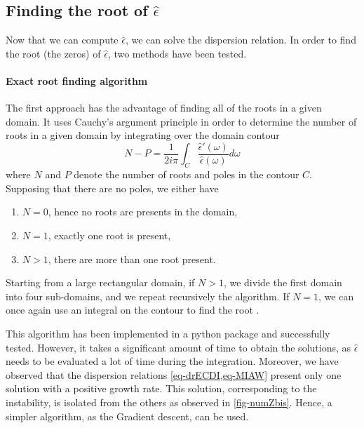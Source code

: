   \subsection{Finding the root of \texorpdfstring{$\hat\epsilon$}{the plasma dielectric function.} }

  Now that we can compute $\hat\epsilon$, we can solve the dispersion relation.
  In order to find the root (the zeros) of $\hat\epsilon$, two methods have been tested.
  
  
  \paragraph{Exact root finding algorithm\\}
    The first approach has the advantage of finding all of the roots in a given domain.
    It uses Cauchy's argument principle in order to determine the number of roots in a given domain by integrating over the domain contour
    \begin{equation} \label{eq-rootnumber}
      N - P = \frac{1}{2 i \pi} \int_{C} \frac{\hat\epsilon'(\omega)}{\hat\epsilon(\omega)} d\omega
    \end{equation}
    where $N$ and $P$ denote the number of roots and poles in the contour $C$.
    Supposing that there are no poles, we either have
    \begin{enumerate}
      \item $N=0$, hence no roots are presents in the domain,
      \item $N=1$, exactly one root is present,
      \item $N>1$, there are more than one root present.
    \end{enumerate}

    Starting from a large rectangular domain, if $N>1$, we divide the first domain into four sub-domains, and we repeat recursively the algorithm.
    If $N=1$, we can once again use an integral on the contour to find the root \citep{fortune2001}.
    
    \vspace{1em}
    This algorithm has been implemented in a python package and successfully tested.
    However, it takes a significant amount of time to obtain the solutions, as $\hat\epsilon$ needs to be evaluated a lot of time during the integration.
    Moreover, we have observed that the dispersion relations \cref{eq-drECDI,eq-MIAW} present only one solution with a positive growth rate.
    This solution, corresponding to the instability, is isolated from the others as observed in \cref{fig-numZbis}.
    Hence, a simpler algorithm, as the Gradient descent, can be used.
    
